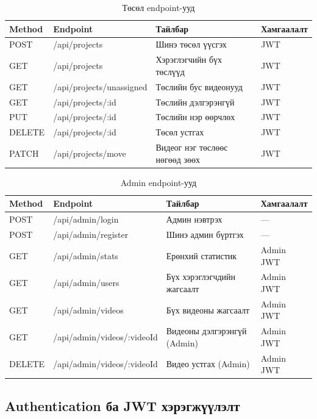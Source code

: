 \begin{table}[H]
\centering
\label{tab:project_api}
\begin{tabular}{|l|p{5cm}|p{3.5cm}|l|}
\hline
\textbf{Method} & \textbf{Endpoint} & \textbf{Тайлбар} & \textbf{Хамгаалалт} \\
\hline
POST & /api/projects & Шинэ төсөл үүсгэх & JWT \\
\hline
GET & /api/projects & Хэрэглэгчийн бүх төслүүд & JWT \\
\hline
GET & /api/projects/unassigned & Төслийн бус видеонууд & JWT \\
\hline
GET & /api/projects/:id & Төслийн дэлгэрэнгүй & JWT \\
\hline
PUT & /api/projects/:id & Төслийн нэр өөрчлөх & JWT \\
\hline
DELETE & /api/projects/:id & Төсөл устгах & JWT \\
\hline
PATCH & /api/projects/move & Видеог нэг төслөөс нөгөөд зөөх & JWT \\
\hline
\end{tabular}
\caption{Төсөл endpoint-ууд}
\end{table}

\begin{table}[H]
\centering
\label{tab:admin_api}
\begin{tabular}{|l|p{5cm}|p{3.5cm}|l|}
\hline
\textbf{Method} & \textbf{Endpoint} & \textbf{Тайлбар} & \textbf{Хамгаалалт} \\
\hline
POST & /api/admin/login & Админ нэвтрэх & --- \\
\hline
POST & /api/admin/register & Шинэ админ бүртгэх & --- \\
\hline
GET & /api/admin/stats & Ерөнхий статистик & Admin JWT \\
\hline
GET & /api/admin/users & Бүх хэрэглэгчдийн жагсаалт & Admin JWT \\
\hline
GET & /api/admin/videos & Бүх видеоны жагсаалт & Admin JWT \\
\hline
GET & /api/admin/videos/:videoId & Видеоны дэлгэрэнгүй (Admin) & Admin JWT \\
\hline
DELETE & /api/admin/videos/:videoId & Видео устгах (Admin) & Admin JWT \\
\hline
\end{tabular}
\caption{Admin endpoint-ууд}
\end{table}

\subsection{Authentication ба JWT хэрэгжүүлэлт}

